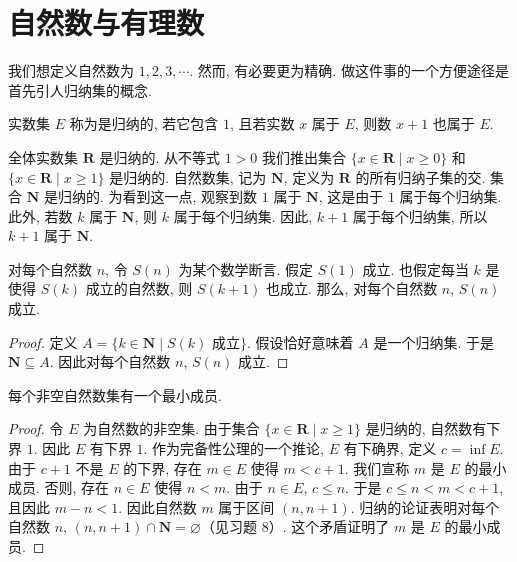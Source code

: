 \documentclass[../../main.tex]{subfiles}
\begin{document}
\section{自然数与有理数}\label{section:ch01-自然数有理数}

我们想定义自然数为 $1,2,3,\cdots$. 然而, 有必要更为精确. 做这件事的一个方便途径是首先引人归纳集的概念.

\begin{definition}[归纳集]\label{definition:ch01-归纳集}
实数集 $E$ 称为是归纳的, 若它包含 $1$, 且若实数 $x$ 属于 $E$, 则数 $x+1$ 也属于 $E$.
\end{definition}

全体实数集 $\mathbf{R}$ 是归纳的. 从不等式 $1>0$ 我们推出集合 $\{x\in\mathbf{R}\mid x\geqslant 0\}$ 和 $\{x\in\mathbf{R}\mid x\geqslant 1\}$ 是归纳的. 自然数集, 记为 $\mathbf{N}$, 定义为 $\mathbf{R}$ 的所有归纳子集的交. 集合 $\mathbf{N}$ 是归纳的. 为看到这一点, 观察到数 $1$ 属于 $\mathbf{N}$, 这是由于 $1$ 属于每个归纳集. 此外, 若数 $k$ 属于 $\mathbf{N}$, 则 $k$ 属于每个归纳集. 因此, $k+1$ 属于每个归纳集, 所以 $k+1$ 属于 $\mathbf{N}$.

\begin{proposition}[数学归纳法原理]\label{proposition:ch01-数学归纳法}
对每个自然数 $n$, 令 $S(n)$ 为某个数学断言. 假定 $S(1)$ 成立. 也假定每当 $k$ 是使得 $S(k)$ 成立的自然数, 则 $S(k+1)$ 也成立. 那么, 对每个自然数 $n$, $S(n)$ 成立.
\end{proposition}

\begin{proof}
定义 $A=\{k\in\mathbf{N}\mid S(k)\text{ 成立}\}$. 假设恰好意味着 $A$ 是一个归纳集. 于是 $\mathbf{N}\subseteq A$. 因此对每个自然数 $n$, $S(n)$ 成立.
\end{proof}

\begin{theorem}\label{theorem:ch01-自然数最小元}
每个非空自然数集有一个最小成员.
\end{theorem}

\begin{proof}
令 $E$ 为自然数的非空集. 由于集合 $\{x\in\mathbf{R}\mid x\geqslant 1\}$ 是归纳的, 自然数有下界 $1$. 因此 $E$ 有下界 $1$. 作为完备性公理的一个推论, $E$ 有下确界, 定义 $c=\inf E$. 由于 $c+1$ 不是 $E$ 的下界, 存在 $m\in E$ 使得 $m<c+1$. 我们宣称 $m$ 是 $E$ 的最小成员. 否则, 存在 $n\in E$ 使得 $n<m$. 由于 $n\in E$, $c\leqslant n$. 于是 $c\leqslant n<m<c+1$, 且因此 $m-n<1$. 因此自然数 $m$ 属于区间 $(n,n+1)$. 归纳的论证表明对每个自然数 $n$, $(n,n+1)\cap\mathbf{N}=\varnothing$（见习题 8）. 这个矛盾证明了 $m$ 是 $E$ 的最小成员.
\end{proof}
\end{document}

